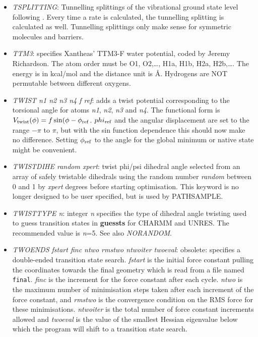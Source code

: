 \documentclass[12pt,a4paper,dvips]{article}
\begin{document}
\begin{itemize}
\item {\it TSPLITTING\/}: Tunnelling splittings of the vibrational ground state level following
\cite{ric11}. Every time a rate is calculated, the tunnelling splitting
is calculated as well. Tunnelling splittings only make sense for
symmetric molecules and barriers.


\item {\it TTM3\/}: specifies Xantheas' TTM3-F water potential, coded
by Jeremy Richardson.
The atom order must be O1, O2,\ldots, H1a, H1b, H2a, H2b,\ldots.
The energy is in kcal/mol and the distance unit is \AA.
Hydrogens are NOT permutable between different oxygens.

\item {\it TWIST n1 n2 n3 n4 f ref\/}: adds a twist potential corresponding to the
torsional angle for atoms {\it n1}, {\it n2}, {\it n3} and {\it n4}.
The functional form is $V_{\rm twist}(\phi)=f\sin(\phi-\phi_{\rm ref}$.
$phi_{\rm ref}$ and the angular displacement are set to the range $-\pi$ to $\pi$,
but with the sin function dependence this should now make no difference.
Setting $\phi_{\rm ref}$ to the angle for the global minimum or native state might
be convenient.

\item {\it TWISTDIHE random xpert\/}: twist phi/psi dihedral angle selected from an array of safely
twistable dihedrals using the random number {\it random\/} between 0 and 1 by {\it xpert\/} degrees before 
starting optimisation. This keyword is no longer designed to be user specified, but is used by PATHSAMPLE.

\item {\it TWISTTYPE n\/}: integer {\it n\/} specifies the type of dihedral angle twisting
used to  guess transition states in {\bf guessts} for CHARMM and UNRES.
The recommended value is {\it n}=5. See also {\it NORANDOM\/}.

\item {\it TWOENDS fstart finc ntwo rmstwo ntwoiter twoeval\/}: obsolete: specifies a double-ended transition
state search. {\it fstart\/} is the initial force constant pulling the coordinates towards the final
geometry which is read from a file named {\tt final}. {\it finc\/} is the increment for the force 
constant after each cycle. {\it ntwo\/} is the maximum number of minimisation steps taken after each
increment of the force constant, and {\it rmstwo\/} is the convergence condition on the RMS force
for these minimisations. {\it ntwoiter\/} is the total number of force constant increments allowed
and {\it twoeval\/} is the value of the smallest Hessian eigenvalue below which the program will
shift to a transition state search.


\end{itemize}
\end{document}
